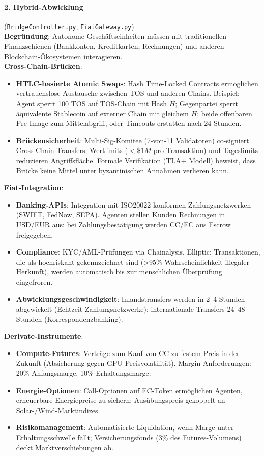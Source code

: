 \documentclass[11pt]{article}
\begin{document}
\paragraph{2. Hybrid-Abwicklung} (\texttt{BridgeController.py}, \texttt{FiatGateway.py})\\
\textbf{Begründung}: Autonome Geschäftseinheiten müssen mit traditionellen Finanzschienen (Bankkonten, Kreditkarten, Rechnungen) und anderen Blockchain-Ökosystemen interagieren.\\
\textbf{Cross-Chain-Brücken}:
\begin{itemize}[noitemsep]
  \item \textbf{HTLC-basierte Atomic Swaps}: Hash Time-Locked Contracts ermöglichen vertrauenslose Austausche zwischen TOS und anderen Chains. Beispiel: Agent sperrt 100 TOS auf TOS-Chain mit Hash $H$; Gegenpartei sperrt äquivalente Stablecoin auf externer Chain mit gleichem $H$; beide offenbaren Pre-Image zum Mittelabgriff, oder Timeouts erstatten nach 24 Stunden.
  \item \textbf{Brückensicherheit}: Multi-Sig-Komitee (7-von-11 Validatoren) co-signiert Cross-Chain-Transfers; Wertlimits ($<\$1M$ pro Transaktion) und Tageslimits reduzieren Angriffsfläche. Formale Verifikation (TLA+ Modell) beweist, dass Brücke keine Mittel unter byzantinischen Annahmen verlieren kann.
\end{itemize}
\textbf{Fiat-Integration}:
\begin{itemize}[noitemsep]
  \item \textbf{Banking-APIs}: Integration mit ISO20022-konformen Zahlungsnetzwerken (SWIFT, FedNow, SEPA). Agenten stellen Kunden Rechnungen in USD/EUR aus; bei Zahlungsbestätigung werden CC/EC aus Escrow freigegeben.
  \item \textbf{Compliance}: KYC/AML-Prüfungen via Chainalysis, Elliptic; Transaktionen, die als hochriskant gekennzeichnet sind (>95\% Wahrscheinlichkeit illegaler Herkunft), werden automatisch bis zur menschlichen Überprüfung eingefroren.
  \item \textbf{Abwicklungsgeschwindigkeit}: Inlandstransfers werden in 2--4 Stunden abgewickelt (Echtzeit-Zahlungsnetzwerke); internationale Transfers 24--48 Stunden (Korrespondenzbanking).
\end{itemize}
\textbf{Derivate-Instrumente}:
\begin{itemize}[noitemsep]
  \item \textbf{Compute-Futures}: Verträge zum Kauf von CC zu festem Preis in der Zukunft (Absicherung gegen GPU-Preisvolatilität). Margin-Anforderungen: 20\% Anfangsmarge, 10\% Erhaltungsmarge.
  \item \textbf{Energie-Optionen}: Call-Optionen auf EC-Token ermöglichen Agenten, erneuerbare Energiepreise zu sichern; Ausübungspreis gekoppelt an Solar-/Wind-Marktindizes.
  \item \textbf{Risikomanagement}: Automatisierte Liquidation, wenn Marge unter Erhaltungsschwelle fällt; Versicherungsfonds (3\% des Futures-Volumens) deckt Marktverschiebungen ab.
\end{itemize}
\end{document}

